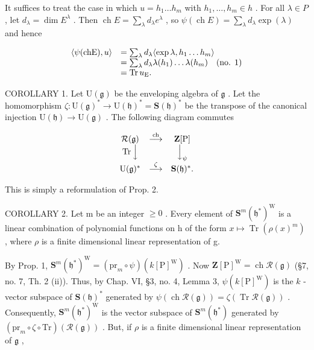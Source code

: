It suffices to treat the case in which \(u = h_{1} \ldots h_{m}\) with \(h_{1}, \ldots, h_{m} \in h\) . For all \(\lambda \in P\) , let \(d_{\lambda} = \dim E^{\lambda}\) . Then \(\operatorname{ch} E = \sum_{\lambda} d_{\lambda} e^{\lambda}\) , so \(\psi(\operatorname{ch} E) = \sum_{\lambda} d_{\lambda} \exp(\lambda)\) and hence

\[
\begin{array}{r l} \langle \psi (\mathrm{chE}), u \rangle & = \sum_ {\lambda} d _ {\lambda} \langle \exp \lambda , h _ {1} \dots h _ {m} \rangle \\ & = \sum_ {\lambda} d _ {\lambda} \lambda (h _ {1}) \dots \lambda (h _ {m}) \quad (\text {no. 1}) \\ & = \operatorname{Tr} u _ {\mathrm{E}}. \end{array}
\]

COROLLARY 1. Let \(\mathrm{U}(\mathfrak{g})\) be the enveloping algebra of \(\mathfrak{g}\) . Let the homomorphism \(\zeta : \mathrm{U}(\mathfrak{g})^* \to \mathrm{U}(\mathfrak{h})^* = \mathbf{S}(\mathfrak{h})^*\) be the transpose of the canonical injection \(\mathrm{U}(\mathfrak{h}) \to \mathrm{U}(\mathfrak{g})\) . The following diagram commutes

\[
\begin{array}{c c c} \mathcal {R} (\mathfrak {g}) & \stackrel {{\text {ch}}} {{\longrightarrow}} & \mathbf {Z} [ \mathrm{P} ] \\ \operatorname{Tr} \Big \downarrow & & \Big \downarrow_ {\psi} \\ \mathrm{U} (\mathfrak {g}) ^ {*} & \stackrel {{\zeta}} {{\longrightarrow}} & \mathbf {S} (\mathfrak {h}) ^ {*}. \end{array}
\]

This is simply a reformulation of Prop. 2.

COROLLARY 2. Let m be an integer \(\geq 0\) . Every element of \(\mathbf{S}^{m}(\mathfrak{h}^{*})^{\mathrm{W}}\) is a linear combination of polynomial functions on h of the form \(x \mapsto \operatorname{Tr}(\rho(x)^{m})\) , where \(\rho\) is a finite dimensional linear representation of g.

By Prop. 1, \(\mathbf{S}^m (\mathfrak{h}^*)^{\mathrm{W}} = (\mathrm{pr}_m\circ \psi)(k[\mathrm{P}]^{\mathrm{W}})\) . Now \(\mathbf{Z}[\mathrm{P}]^{\mathrm{W}} = \operatorname {ch}\mathcal{R}(\mathfrak{g})\) (§7, no. 7, Th. 2 (ii)). Thus, by Chap. VI, §3, no. 4, Lemma 3, \(\psi (k[\mathrm{P}]^{\mathrm{W}})\) is the \(k\) -vector subspace of \(\mathbf{S}(\mathfrak{h})^{*}\) generated by \(\psi (\operatorname {ch}\mathcal{R}(\mathfrak{g})) = \zeta (\operatorname {Tr}\mathcal{R}(\mathfrak{g}))\) . Consequently, \(\mathbf{S}^m (\mathfrak{h}^*)^{\mathrm{W}}\) is the vector subspace of \(\mathbf{S}^m (\mathfrak{h}^*)\) generated by \((\mathrm{pr}_m\circ \zeta \circ \mathrm{Tr})(\mathcal{R}(\mathfrak{g}))\) . But, if \(\rho\) is a finite dimensional linear representation of \(\mathfrak{g}\) ,

